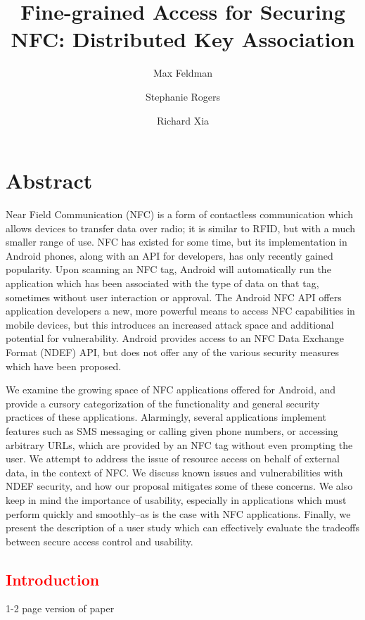 \documentclass[12pt]{article}
\newcommand\TODO[1]{\textcolor{red}{#1}}
\begin{document}
\title{Fine-grained Access for Securing NFC:  Distributed Key Association}
\author{Max Feldman \and Stephanie Rogers \and Richard Xia}
\maketitle

\section{Abstract}
Near Field Communication (NFC) is a form of contactless communication which allows devices to transfer data over radio; it is similar to RFID, but with a much smaller range of use.
NFC has existed for some time, but its implementation in Android phones, along with an API for developers, has only recently gained popularity.
Upon scanning an NFC tag, Android will automatically run the application which has been associated with the type of data on that tag, sometimes without user interaction or approval.
The Android NFC API offers application developers a new, more powerful means to access NFC capabilities in mobile devices, but this introduces an increased attack space and additional potential for vulnerability.
Android provides access to an NFC Data Exchange Format (NDEF) API, but does not offer any of the various security measures which have been proposed.

We examine the growing space of NFC applications offered for Android, and provide a cursory categorization of the functionality and general security practices of these applications.
Alarmingly, several applications implement features such as SMS messaging or calling given phone numbers, or accessing arbitrary URLs, which are provided by an NFC tag without even prompting the user.
We attempt to address the issue of resource access on behalf of external data, in the context of NFC.
We discuss known issues and vulnerabilities with NDEF security, and how our proposal mitigates some of these concerns.
We also keep in mind the importance of usability, especially in applications which must perform quickly and smoothly--as is the case with NFC applications. Finally, we present the description of a user study which can effectively evaluate the tradeoffs between secure access control and usability.

\TODO{\section{Introduction}}
1-2 page version of paper
\end{document}
